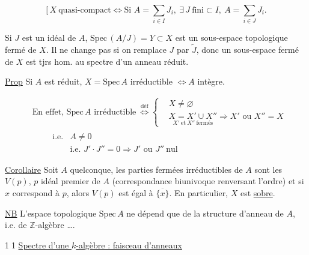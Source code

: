 
\[
\bigl[\,X\ \text{quasi-compact}\Longleftrightarrow
\text{Si } A=\sum_{i\in I}J_i,\ \exists\,J\ \text{fini}\subset I,\ A=\sum_{i\in J}J_i.
\]


Si $J$ est un idéal de $A$, $\mathrm{Spec}\,(A/J)=Y\subset X$ est un sous-espace topologique fermé de $X$.  Il ne change pas si on remplace $J$ par $\widetilde J$, donc  un sous-espace fermé de $X$ est tjrs hom. au spectre d'un anneau réduit.

\uline{Prop} Si $A$ est réduit, $X=\mathrm{Spec}\,A$ irréductible $\Longleftrightarrow A$ intègre.

\[
\begin{aligned}
&\text{En effet, $\mathrm{Spec}\,A$ irréductible}\ \overset{\text{déf}}{\Longleftrightarrow}
\left\{\begin{aligned}
&X\ne\varnothing\\
&\underset{X'\ \mathrm{et}\ X''\ \mathrm{fermés}}{X=X'\cup X''}\Rightarrow X'\text{ ou }X''=X
\end{aligned}\right.\\[-1pt]
&\qquad\begin{array}{l|l}
\text{i.e.}& A\ne0\\
&\text{i.e. }J'\cdot J''=0\Rightarrow J'\text{ ou }J''\ \text{nul}
\end{array}
\end{aligned}
\]

\uline{Corollaire} Soit $A$ quelconque,  les parties fermées irréductibles de $A$ sont les $V(p)$, $p$ idéal premier de $A$ (correspondance biunivoque  renversant l'ordre) et  si $x$ correspond à $p$, alors $V(p)$ est égal à $\overline{\{x\}}$. En particulier, $X$ est \uline{sobre}.



\uline{NB} L'espace topologique $\mathrm{Spec}\,A$ ne dépend que de la structure d'anneau de $A$, i.e. de $\mathbb Z$-algèbre \ldots.

\textcircled{11} \uline{Spectre d'une $k$-algèbre : faisceau d'anneaux}

